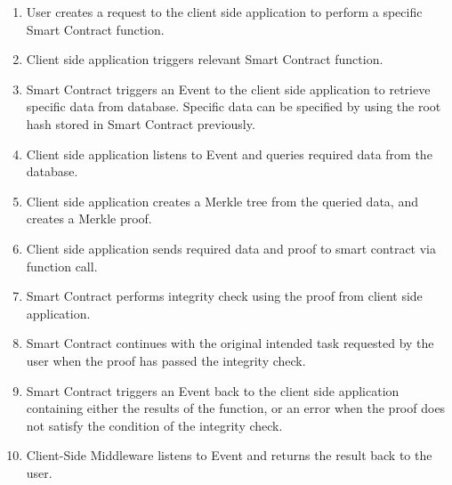 \begin{enumerate}
\item User creates a request to the client side application to perform a specific Smart Contract function. 
\item Client side application triggers relevant Smart Contract function.
\item Smart Contract triggers an Event to the client side application to retrieve specific data from database. Specific data can be specified by using the root hash stored in Smart Contract previously.
\item Client side application listens to Event and queries required data from the database.
\item Client side application creates a Merkle tree from the queried data, and creates a Merkle proof.
\item Client side application sends required data and proof to smart contract via function call.
\item Smart Contract performs integrity check using the proof from client side application.
\item Smart Contract continues with the original intended task requested by the user when the proof has passed the integrity check. 
\item Smart Contract triggers an Event back to the client side application containing either the results of the function, or an error when the proof does not satisfy the condition of the integrity check. 
\item Client-Side Middleware listens to Event and returns the result back to the user. 
\end{enumerate}
